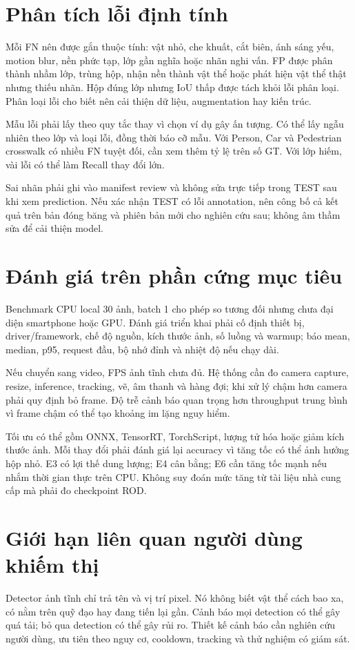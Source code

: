 \section{Phân tích lỗi định tính}
Mỗi FN nên được gắn thuộc tính: vật nhỏ, che khuất, cắt biên, ánh sáng yếu, motion blur, nền phức tạp, lớp gần nghĩa hoặc nhãn nghi vấn. FP được phân thành nhầm lớp, trùng hộp, nhận nền thành vật thể hoặc phát hiện vật thể thật nhưng thiếu nhãn. Hộp đúng lớp nhưng IoU thấp được tách khỏi lỗi phân loại. Phân loại lỗi cho biết nên cải thiện dữ liệu, augmentation hay kiến trúc.

Mẫu lỗi phải lấy theo quy tắc thay vì chọn ví dụ gây ấn tượng. Có thể lấy ngẫu nhiên theo lớp và loại lỗi, đồng thời báo cỡ mẫu. Với Person, Car và Pedestrian crosswalk có nhiều FN tuyệt đối, cần xem thêm tỷ lệ trên số GT. Với lớp hiếm, vài lỗi có thể làm Recall thay đổi lớn.

Sai nhãn phải ghi vào manifest review và không sửa trực tiếp trong TEST sau khi xem prediction. Nếu xác nhận TEST có lỗi annotation, nên công bố cả kết quả trên bản đóng băng và phiên bản mới cho nghiên cứu sau; không âm thầm sửa để cải thiện model.

\section{Đánh giá trên phần cứng mục tiêu}
Benchmark CPU local 30 ảnh, batch 1 cho phép so tương đối nhưng chưa đại diện smartphone hoặc GPU. Đánh giá triển khai phải cố định thiết bị, driver/framework, chế độ nguồn, kích thước ảnh, số luồng và warmup; báo mean, median, p95, request đầu, bộ nhớ đỉnh và nhiệt độ nếu chạy dài.

Nếu chuyển sang video, FPS ảnh tĩnh chưa đủ. Hệ thống cần đo camera capture, resize, inference, tracking, vẽ, âm thanh và hàng đợi; khi xử lý chậm hơn camera phải quy định bỏ frame. Độ trễ cảnh báo quan trọng hơn throughput trung bình vì frame chậm có thể tạo khoảng im lặng nguy hiểm.

Tối ưu có thể gồm ONNX, TensorRT, TorchScript, lượng tử hóa hoặc giảm kích thước ảnh. Mỗi thay đổi phải đánh giá lại accuracy vì tăng tốc có thể ảnh hưởng hộp nhỏ. E3 có lợi thế dung lượng; E4 cân bằng; E6 cần tăng tốc mạnh nếu nhắm thời gian thực trên CPU. Không suy đoán mức tăng từ tài liệu nhà cung cấp mà phải đo checkpoint ROD.

\section{Giới hạn liên quan người dùng khiếm thị}
Detector ảnh tĩnh chỉ trả tên và vị trí pixel. Nó không biết vật thể cách bao xa, có nằm trên quỹ đạo hay đang tiến lại gần. Cảnh báo mọi detection có thể gây quá tải; bỏ qua detection có thể gây rủi ro. Thiết kế cảnh báo cần nghiên cứu người dùng, ưu tiên theo nguy cơ, cooldown, tracking và thử nghiệm có giám sát.

